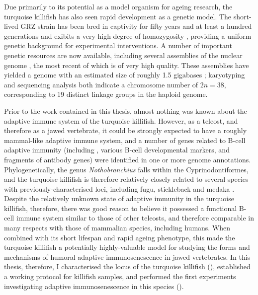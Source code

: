 Due primarily to its potential as a model organism for ageing research, the turquoise killifish has also seen rapid development as a genetic model. The short-lived GRZ strain has been bred in captivity for fifty years and at least a hundred generations \parencite{terzibasi2007review} and exibits a very high degree of homozygosity \parencite{kirschner2012map,reichwald2009genome,valenzano2009map}, providing a uniform genetic background for experimental interventions. A number of important genetic resources are now available, including several assemblies of the nuclear genome \parencite{reichwald2015genome,valenzano2015genome,willemsen2019popgen}, the most recent of which \parencite{willemsen2019popgen} is of very high quality. These assemblies have yielded a genome with an estimated size of roughly 1.5 gigabases \parencite{willemsen2019popgen};
karyotyping \parencite{reichwald2009genome} and sequencing analysis \parencite{reichwald2015genome} both indicate a chromosome number of $2n = 38$, corresponding to 19 distinct linkage groups in the haploid genome.

Prior to the work contained in this thesis, almost nothing was known about the adaptive immune system of the turquoise killifish. However, as a teleost, and therefore as a jawed vertebrate, it could be strongly expected to have a roughly mammal-like adaptive immune system, and a number of genes related to B-cell adaptive immunity (including , various B-cell developmental markers, and fragments of antibody genes) were identified in one or more genome annotations. Phylogenetically, the genus \textit{Nothobranchius} falls within the Cyprinodontiformes, and the turquoise killifish is therefore relatively closely related to several species with previously-characterised \igh{} loci, including fugu, stickleback and medaka \parencite{terzibasi2007review,hughes2018teleostphylo}. Despite the relatively unknown state of adaptive immunity in the turquoise killifish, therefore, there was good reason to believe it possessed a functional B-cell immune system similar to those of other teleosts, and therefore comparable in many respects with those of mammalian species, including humans. When combined with its short lifespan and rapid ageing phenotype, this made the turquoise killifish a potentially highly-valuable model for studying the forms and mechanisms of humoral adaptive immunosenescence in jawed vertebrates. %
In this thesis, therefore, I characterised the \igh{} locus of the turquoise killifish (), established a working \igseq protocol for killifish samples, and performed the first experiments investigating adaptive immunosenescence in this species (). %

